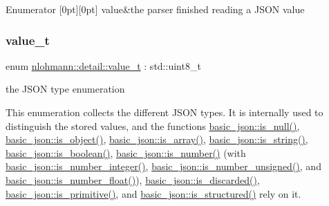\begin{DoxyEnumFields}{Enumerator}
[0pt][0pt]{}\mbox{\label{namespacenlohmann_1_1detail_a59e696b1dad6d0d99c172ac4518c2042a2063c1608d6e0baf80249c42e2be5804}} 
value&the parser finished reading a J\+S\+ON value \\
\hline

\end{DoxyEnumFields}
\mbox{\label{namespacenlohmann_1_1detail_a1ed8fc6239da25abcaf681d30ace4985}} 
\subsubsection{\texorpdfstring{value\+\_\+t}{value\_t}}
{\footnotesize\ttfamily enum \hyperlink{namespacenlohmann_1_1detail_a1ed8fc6239da25abcaf681d30ace4985}{nlohmann\+::detail\+::value\+\_\+t} \+: std\+::uint8\+\_\+t\hspace{0.3cm}{\ttfamily [strong]}}



the J\+S\+ON type enumeration 

This enumeration collects the different J\+S\+ON types. It is internally used to distinguish the stored values, and the functions \hyperlink{classnlohmann_1_1basic__json_aedc7afad96292b5ab61a2e0ad3067f5f}{basic\+\_\+json\+::is\+\_\+null()}, \hyperlink{classnlohmann_1_1basic__json_a57e8411a770a6263d6d8f2116c37f3aa}{basic\+\_\+json\+::is\+\_\+object()}, \hyperlink{classnlohmann_1_1basic__json_ab5b70d60a636b9c5e10f6c8caac60b9e}{basic\+\_\+json\+::is\+\_\+array()}, \hyperlink{classnlohmann_1_1basic__json_ab303d17366c26fca12242c7f8def1bb7}{basic\+\_\+json\+::is\+\_\+string()}, \hyperlink{classnlohmann_1_1basic__json_a911b11e855e685fa59ea1d111490b36b}{basic\+\_\+json\+::is\+\_\+boolean()}, \hyperlink{classnlohmann_1_1basic__json_abd47ac8eba63833152795280f75b5851}{basic\+\_\+json\+::is\+\_\+number()} (with \hyperlink{classnlohmann_1_1basic__json_ac4b4acf2c0ad075c0dc125a65c102362}{basic\+\_\+json\+::is\+\_\+number\+\_\+integer()}, \hyperlink{classnlohmann_1_1basic__json_a5493f2ed1e07b0ece428bd5a47e2fb95}{basic\+\_\+json\+::is\+\_\+number\+\_\+unsigned()}, and \hyperlink{classnlohmann_1_1basic__json_a116cdb9300b56519fc9cf756609296cb}{basic\+\_\+json\+::is\+\_\+number\+\_\+float()}), \hyperlink{classnlohmann_1_1basic__json_aecaaa0613d3f3a5b49b34b02afc5f85d}{basic\+\_\+json\+::is\+\_\+discarded()}, \hyperlink{classnlohmann_1_1basic__json_a548d2d4013da24e7d7510d90febc80c4}{basic\+\_\+json\+::is\+\_\+primitive()}, and \hyperlink{classnlohmann_1_1basic__json_a4e05a7d5deec758f1d830741b68b4249}{basic\+\_\+json\+::is\+\_\+structured()} rely on it.

